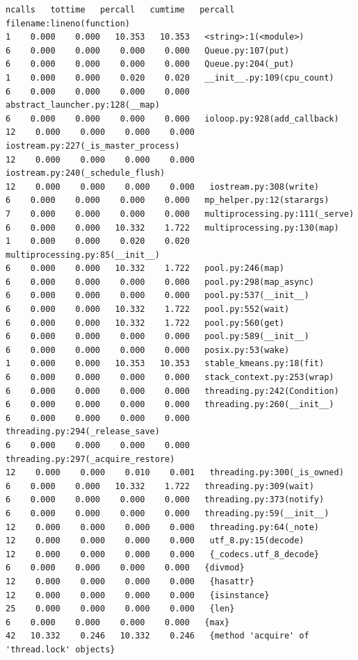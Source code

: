 \documentclass[10pt,twocolumn,letterpaper]{article}
\begin{document}
\begin{appendices}
\begin{verbatim}
ncalls   tottime   percall   cumtime   percall   filename:lineno(function)
1    0.000    0.000   10.353   10.353   <string>:1(<module>)
6    0.000    0.000    0.000    0.000   Queue.py:107(put)
6    0.000    0.000    0.000    0.000   Queue.py:204(_put)
1    0.000    0.000    0.020    0.020   __init__.py:109(cpu_count)
6    0.000    0.000    0.000    0.000   abstract_launcher.py:128(__map)
6    0.000    0.000    0.000    0.000   ioloop.py:928(add_callback)
12    0.000    0.000    0.000    0.000   iostream.py:227(_is_master_process)
12    0.000    0.000    0.000    0.000   iostream.py:240(_schedule_flush)
12    0.000    0.000    0.000    0.000   iostream.py:308(write)
6    0.000    0.000    0.000    0.000   mp_helper.py:12(starargs)
7    0.000    0.000    0.000    0.000   multiprocessing.py:111(_serve)
6    0.000    0.000   10.332    1.722   multiprocessing.py:130(map)
1    0.000    0.000    0.020    0.020   multiprocessing.py:85(__init__)
6    0.000    0.000   10.332    1.722   pool.py:246(map)
6    0.000    0.000    0.000    0.000   pool.py:298(map_async)
6    0.000    0.000    0.000    0.000   pool.py:537(__init__)
6    0.000    0.000   10.332    1.722   pool.py:552(wait)
6    0.000    0.000   10.332    1.722   pool.py:560(get)
6    0.000    0.000    0.000    0.000   pool.py:589(__init__)
6    0.000    0.000    0.000    0.000   posix.py:53(wake)
1    0.000    0.000   10.353   10.353   stable_kmeans.py:18(fit)
6    0.000    0.000    0.000    0.000   stack_context.py:253(wrap)
6    0.000    0.000    0.000    0.000   threading.py:242(Condition)
6    0.000    0.000    0.000    0.000   threading.py:260(__init__)
6    0.000    0.000    0.000    0.000   threading.py:294(_release_save)
6    0.000    0.000    0.000    0.000   threading.py:297(_acquire_restore)
12    0.000    0.000    0.010    0.001   threading.py:300(_is_owned)
6    0.000    0.000   10.332    1.722   threading.py:309(wait)
6    0.000    0.000    0.000    0.000   threading.py:373(notify)
6    0.000    0.000    0.000    0.000   threading.py:59(__init__)
12    0.000    0.000    0.000    0.000   threading.py:64(_note)
12    0.000    0.000    0.000    0.000   utf_8.py:15(decode)
12    0.000    0.000    0.000    0.000   {_codecs.utf_8_decode}
6    0.000    0.000    0.000    0.000   {divmod}
12    0.000    0.000    0.000    0.000   {hasattr}
12    0.000    0.000    0.000    0.000   {isinstance}
25    0.000    0.000    0.000    0.000   {len}
6    0.000    0.000    0.000    0.000   {max}
42   10.332    0.246   10.332    0.246   {method 'acquire' of 'thread.lock' objects}

\end{verbatim}
\end{appendices}
\end{document}
